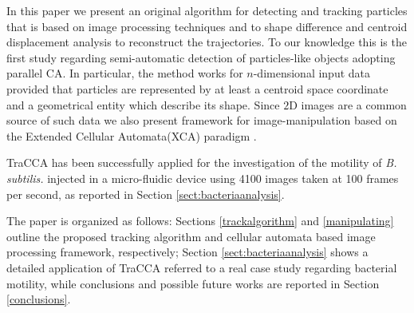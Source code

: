 \documentclass[conference]{IEEEtran}
\begin{document}
In this paper we present an original algorithm for detecting and tracking particles that is based on image processing techniques and to shape difference and centroid displacement analysis to reconstruct the trajectories. To our knowledge this is the first study regarding semi-automatic detection of particles-like objects adopting parallel CA. In particular, the method works for $n$-dimensional input data provided that particles are represented by at least a centroid space coordinate and a geometrical entity which describe its shape. 
Since $2$D images are a common source of such data we also present framework for image-manipulation based on the Extended Cellular Automata(XCA) paradigm .

TraCCA has been successfully applied for the investigation of the motility of \textit{B. subtilis.} injected in a micro-fluidic device using 4100 images taken at 100 frames per second, as reported in Section \ref{sect:bacteriaanalysis}.

The paper is organized as follows: Sections  \ref{trackalgorithm} and \ref{manipulating} outline the proposed tracking algorithm and cellular automata based image processing framework, respectively; Section \ref{sect:bacteriaanalysis} shows a detailed application of TraCCA referred to a real case study regarding bacterial motility, while conclusions and possible future works are reported in Section \ref{conclusions}.
\end{document}
